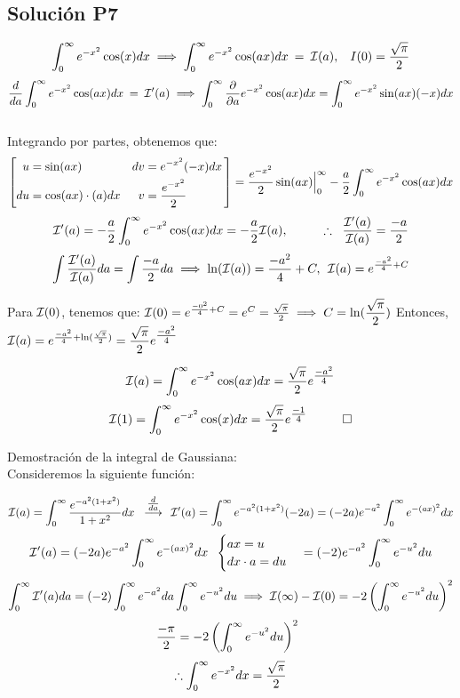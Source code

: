 \begin{CajaTitulo}{\begin{center}\subsection{Solución P7}\end{center}}
    \vspace{0.7cm}

    \[\int_{0}^{\infty}e^{-x^2}\cos(x)dx \implies \int_{0}^{\infty}e^{-x^2}\cos(ax)dx \:=\: \I(a) , \hspace{0.3cm}I(0) = \frac{\sqrt{\pi}}{2} \]
    \[\frac{d}{da}\int_{0}^{\infty}e^{-x^2}\cos(ax)dx \:= \: \I'(a) \implies \int_{0}^{\infty}\frac{\partial}{\partial a}e^{-x^2}\cos(ax)dx  = \int_{0}^{\infty}e^{-x^2}\sin(ax)(-x)dx\]
    \\
    Integrando por partes, obtenemos que:
    \[\PorPartes{\sin(ax)}{\cos(ax) \cdot (a) dx}{e^{-x^2}(-x)dx}{\frac{e^{-x^2}}{2}} =   \frac{e^{-x^2}}{2} \sin(ax) \Brackets_{0}^{\infty}  - \frac{a}{2}\int_{0}^{\infty}e^{-x^2}\cos(ax)dx     \]
    \[\I'(a) = - \frac{a}{2}\int_{0}^{\infty}e^{-x^2}\cos(ax)dx = - \frac{a}{2}\I(a), \hspace{1cm} \Porlo \hspace{0.2cm} \frac{\I'(a)}{\I(a)} = \frac{-a}{2}  \]
    \[\int \frac{\I'(a)}{\I(a)}da = \int \frac{-a}{2} da \implies \ln(\I(a)) = \frac{-a^2}{4} + C, \: \: \I(a) = e^{\frac{-a^2}{4} + C}\]

    Para $\I(0)$, tenemos que: $\I(0) = e^{\frac{-0^2}{4} + C} = e^{C} = \frac{\sqrt{\pi}}{2} \implies C = \ln(\mathlarger{\frac{\sqrt{\pi}}{2}})$ Entonces, $\I(a) = e^{\frac{-a^2}{4} + \ln(\frac{\sqrt{\pi}}{2})} = \mathlarger{ \frac{\sqrt{\pi}}{2}e^{\mathlarger{\frac{-a^2}{4}}}}$

    \[\I(a) = \int_{0}^{\infty}e^{-x^2}\cos(ax)dx = \frac{\sqrt{\pi}}{2}e^{\mathlarger{\frac{-a^2}{4}}}\]
    \[\I(1) = \int_{0}^{\infty}e^{-x^2}\cos(x)dx =  \frac{\sqrt{\pi}}{2}e^{\mathlarger{\frac{-1}{4}}}  \hspace{1cm}\square\]

    Demostración de la integral de Gaussiana:
    \\

    Consideremos la siguiente función:

    \[\I(a) = \int_{0}^{\infty}\frac{ e^{-a^2(1+x^2)}}{1 + x^2}dx \hspace{0.2cm} \Flecha{\mathlarger{\frac{d}{da}}} \: \: \I'(a) = \int_{0}^{\infty}e^{-a^2(1+x^2)}(-2a) = (-2a)e^{-a^2}\int_{0}^{\infty}e^{-(ax)^2} dx \]
    \[\I'(a) = (-2a)e^{-a^2} \int_{0}^{\infty}e^{-{(ax)}^2} dx \hspace{0.2cm}   \cambio{ax = u}{dx \cdot a = du} = (-2) e^{-a^2} \int_{0}^{\infty}e^{-{u}^2}du\]
    \[\int_{0}^{\infty}\I'(a)da = (-2) \int_{0}^{\infty}e^{-a^2}da \int_{0}^{\infty}e^{-{u}^2}du \implies \I(\infty) - \I(0) = -2 \left(\int_{0}^{\infty}e^{-{u}^2}du\right)^2\]
    \[\frac{-\pi}{2} = -2\left(\int_{0}^{\infty}e^{-{u}^2}du\right)^2 \hspace{0.2cm}\]
    \[ \Porlo  \int_{0}^{\infty}e^{-x^2}dx = \frac{\sqrt{\pi}}{2}\]
\end{CajaTitulo}
